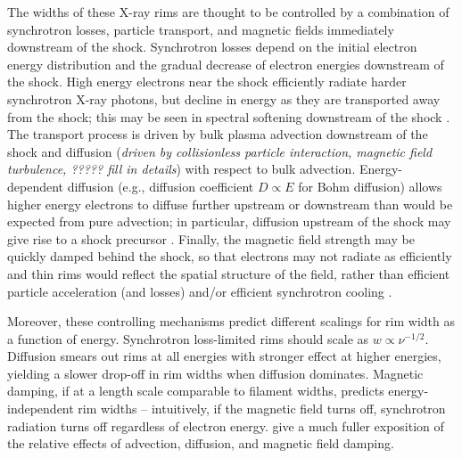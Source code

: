 \documentclass[iop, apj, numberedappendix, twocolappendix]{emulateapj}
\begin{document}
The widths of these X-ray rims are thought to be controlled by a combination of
synchrotron losses, particle transport, and magnetic fields immediately
downstream of the shock.  Synchrotron losses depend on the initial electron
energy distribution and the gradual decrease of electron energies downstream of
the shock.  High energy electrons near the shock efficiently radiate harder
synchrotron X-ray photons, but decline in energy as they are transported away
from the shock; this may be seen in spectral softening downstream of the shock
\citep[e.g.,][]{cassam-chenai2007}.  The transport process is driven by bulk
plasma advection downstream of the shock and diffusion (\emph{driven by
collisionless particle interaction, magnetic field turbulence, ?????  fill in
details}) with respect to bulk advection.  Energy-dependent diffusion (e.g.,
diffusion coefficient $D \propto E$ for Bohm diffusion) allows higher energy
electrons to diffuse further upstream or downstream than would be expected from
pure advection; in particular, diffusion upstream of the shock may give rise to
a shock precursor \citep[e.g.,][]{ghavamian2000, wagner2009, laming2014}.
Finally, the magnetic field strength may be quickly damped behind the shock, so
that electrons may not radiate as efficiently and thin rims would reflect the
spatial structure of the field, rather than efficient particle acceleration
(and losses) and/or efficient synchrotron cooling \citep{pohl2005}.

Moreover, these controlling mechanisms predict different scalings for rim width
as a function of energy.  Synchrotron loss-limited rims should scale as $w
\propto \nu^{-1/2}$.  Diffusion smears out rims at all energies with stronger
effect at higher energies, yielding a slower drop-off in rim widths when
diffusion dominates.  Magnetic damping, if at a length scale comparable to
filament widths, predicts energy-independent rim widths -- intuitively, if the
magnetic field turns off, synchrotron radiation turns off regardless of
electron energy.  \citet{ressler2014} give a much fuller exposition of the
relative effects of advection, diffusion, and magnetic field damping.
\end{document}
